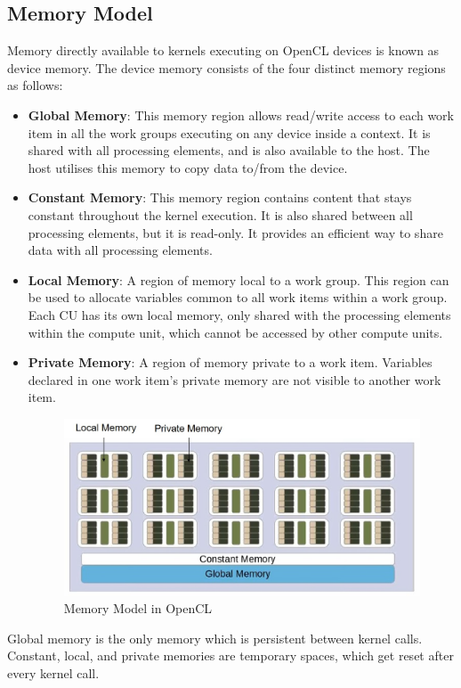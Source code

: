 \subsection{Memory Model}
\label{sect4_1_2}
Memory directly available to kernels executing on OpenCL devices is known as device memory. The device memory consists of the four distinct memory regions as follows: 
\begin{itemize}
\item \textbf{Global Memory}: This memory region allows read/write access to each work item in all the work groups executing on any device inside a context.
It is shared with all processing elements, and is also available to the host. The host utilises this memory to copy data to/from the device.

\item \textbf{Constant Memory}: This memory region contains content that stays constant throughout the kernel execution. It is also shared between all processing elements, but it is read-only. It provides an efficient way to share data with all processing elements.

\item \textbf{Local Memory}: A region of memory local to a work group. This region can be used to allocate variables common to all work items within a work group. Each CU has its own local memory, only shared with the processing elements within the compute unit, which cannot be accessed by other compute units. 

\item \textbf{Private Memory}: A region of memory private to a work item. Variables declared in one work item’s private memory are not visible to another work item.

\begin{figure}[h!]
 \centering
  \includegraphics[width=\linewidth]{figures/OpenCL_Memory_Model.jpg}
  \caption{Memory Model in OpenCL \cite{opencl_ajg}}
  \label{fig:opencl2}
\end{figure}
\end{itemize}
Global memory is the only memory which is persistent between kernel calls. Constant, local, and private memories are temporary spaces, which get reset after every kernel call.

